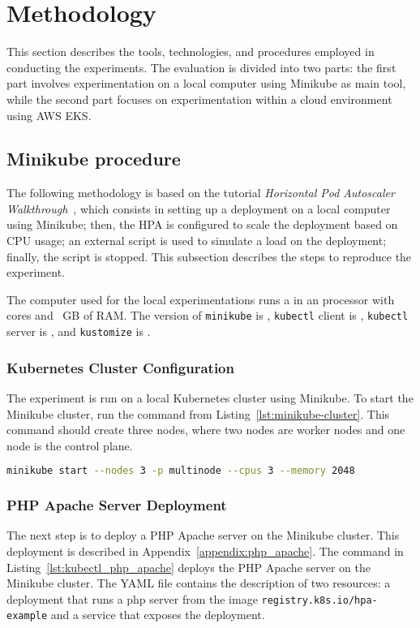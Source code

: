 \section{Methodology}

This section describes the tools, technologies, and procedures employed in conducting the experiments.
The evaluation is divided into two parts: the first part involves experimentation on a local computer using Minikube as main tool, while the second part focuses on experimentation within a cloud environment using AWS EKS.

\subsection{Minikube procedure}
The following methodology is based on the tutorial \textit{Horizontal Pod Autoscaler Walkthrough}~\cite{KubernetesHpaWalkthrough}, which consists in setting up a deployment on a local computer using Minikube; then, the HPA is configured to scale the deployment based on CPU usage; an external script is used to simulate a load on the deployment; finally, the script is stopped.
This subsection describes the steps to reproduce the experiment.

The computer used for the local experimentations runs a \operatingSystem{} in an \cpuModel{} processor with \cpuCores{} cores and \cpuRam{}~GB of RAM.
The version of \texttt{minikube} is \minikubeVersion{}, \texttt{kubectl} client is \kubectlClientVersion{}, \texttt{kubectl} server is \kubectlServerVersion{}, and \texttt{kustomize} is \kubectlKustomizeVersion{}.

\subsubsection{Kubernetes Cluster Configuration}
The experiment is run on a local Kubernetes cluster using Minikube.
To start the Minikube cluster, run the command from Listing~\ref{lst:minikube-cluster}.
This command should create three nodes, where two nodes are worker nodes and one node is the control plane.

\begin{lstlisting}[language=bash, label={lst:minikube-cluster},caption={Starting the Minikube cluster}]
  minikube start --nodes 3 -p multinode --cpus 3 --memory 2048
\end{lstlisting}

\subsubsection{PHP Apache Server Deployment}
The next step is to deploy a PHP Apache server on the Minikube cluster.
This deployment is described in Appendix~\ref{appendix:php_apache}.
The command in Listing~\ref{lst:kubectl_php_apache} deploys the PHP Apache server on the Minikube cluster.
The YAML file contains the description of two resources: a deployment that runs a php server from the image \texttt{registry.k8s.io/hpa-example} and a service that exposes the deployment.

